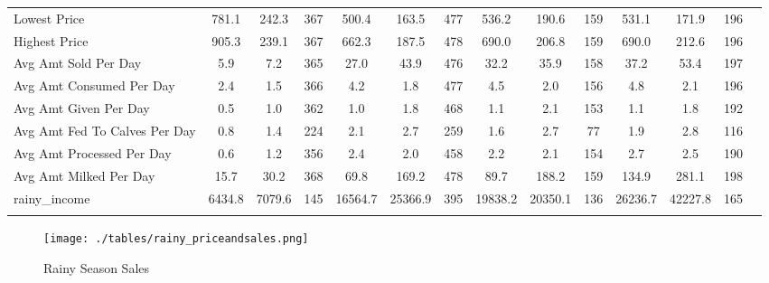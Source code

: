 \documentclass[11pt,letter,draft]{article}
\newcommand{\mcl}{\multicolumn}
\begin{document}
\begin{table}[!th]
{\begin{tabular}{l*{1}{ccccccccccccc}}
Lowest Price    &       781.1&       242.3&         367&       500.4&       163.5&         477&       536.2&       190.6&         159&       531.1&       171.9&         196\\
Highest Price  &       905.3&       239.1&         367&       662.3&       187.5&         478&       690.0&       206.8&         159&       690.0&       212.6&         196\\
Avg Amt Sold Per Day      &         5.9&         7.2&         365&        27.0&        43.9&         476&        32.2&        35.9&         158&        37.2&        53.4&         197\\
Avg Amt Consumed Per Day   &         2.4&         1.5&         366&         4.2&         1.8&         477&         4.5&         2.0&         156&         4.8&         2.1&         196\\
Avg Amt Given Per Day    &         0.5&         1.0&         362&         1.0&         1.8&         468&         1.1&         2.1&         153&         1.1&         1.8&         192\\
Avg Amt Fed To Calves Per Day    &         0.8&         1.4&         224&         2.1&         2.7&         259&         1.6&         2.7&          77&         1.9&         2.8&         116\\
Avg Amt Processed Per Day   &         0.6&         1.2&         356&         2.4&         2.0&         458&         2.2&         2.1&         154&         2.7&         2.5&         190\\

Avg Amt Milked Per Day   &        15.7&        30.2&         368&        69.8&       169.2&         478&        89.7&       188.2&         159&       134.9&       281.1&         198\\
rainy\_income        &      6434.8&      7079.6&         145&     16564.7&     25366.9&         395&     19838.2&     20350.1&         136&     26236.7&     42227.8&         165\\



\hline\hline
\mcl{13}{l}{
\footnotesize{
\parbox{20cm}{\vspace{2mm}\baselineskip=11pt}}}%
\end{tabular}
}
\end{table}



\begin{figure}[!th]
\centering
\caption{Rainy Season Sales}
\label{fig:gender}
\texttt{[image: ./tables/rainy\_priceandsales.png]}
\footnotesize{
\parbox{10cm}{\vspace{2mm}  \baselineskip=11pt}}%
\end{figure}
\end{document}
